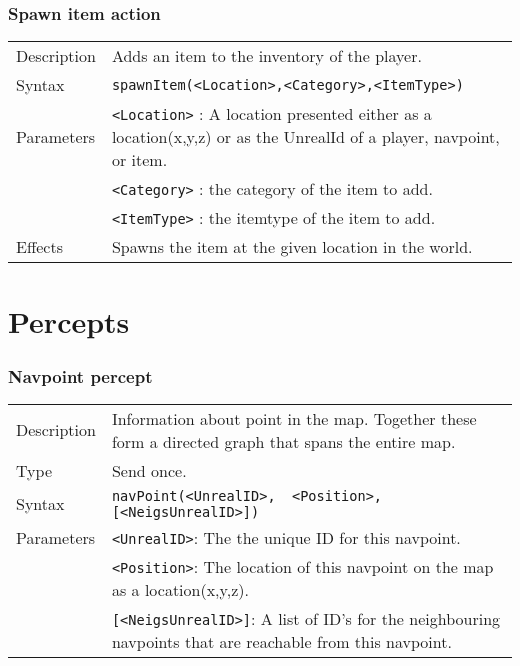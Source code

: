\documentclass[11pt,a4paper]{article}
\begin{document}
\subsubsection*{Spawn item action}

\begin{small}
\begin{tabular}{p{2cm}p{9cm}}
Description & Adds an item to the inventory of the player. \\
Syntax & \verb|spawnItem(<Location>,<Category>,<ItemType>)|\\
Parameters 	& \verb|<Location>| : A location presented either as a location(x,y,z) or as the UnrealId of a player, navpoint, or item. \\
		& \verb|<Category>| : the category of the item to add. \\
		& \verb|<ItemType>| : the itemtype of the item to add. \\
Effects &	Spawns the item at the given location in the world.\\
\end{tabular}
\end{small}

\section{Percepts}

\subsubsection*{Navpoint percept}
\begin{small}
\begin{tabular}{p{2cm}p{9cm}}
Description & Information about point in the map. Together these form a directed graph that spans the entire map.\\
Type & Send once.\\
Syntax & \verb|navPoint(<UnrealID>,  <Position>, [<NeigsUnrealID>])|\\
Parameters & \verb|<UnrealID>|: The the unique ID for this navpoint.\\
& \verb|<Position>|: The location of this navpoint on the map as a location(x,y,z).\\
& \verb|[<NeigsUnrealID>]|: A list of ID's for the neighbouring navpoints that are reachable from this navpoint.
\end{tabular}
\end{small}
\end{document}
